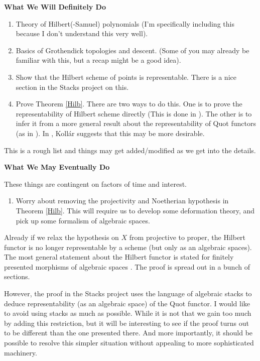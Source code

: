 \documentclass[11pt]{amsart}
\theoremstyle{definition}
\begin{document}
\textbf{What We Will Definitely Do}
\begin{enumerate}
	\item Theory of Hilbert(-Samuel) polynomials (I'm specifically including this because I don't understand this very well).
	\item Basics of Grothendick topologies and descent. (Some of you may already be familiar with this, but a recap might be a good idea).
	\item Show that the Hilbert scheme of points is representable. There is a nice section in the Stacks project \cite[Tag 0B94]{stacks} on this.
	\item Prove Theorem \ref{Hilb}. There are two ways to do this. One is to prove the representability of Hilbert scheme directly (This is done in \cite{Kollar}). The other is to infer it from a more general result about the representability of Quot functors (as in \cite{FGAExplained}). In \cite{Kollar}, Koll\'{a}r suggests that this may be more desirable.
\end{enumerate}

This is a rough list and things may get added/modified as we get into the details.


\vspace{.3cm}
\textbf{What We May Eventually Do}

These things are contingent on factors of time and interest.
\begin{enumerate}
	\item Worry about removing the projectivity and Noetherian hypothesis in Theorem \ref{Hilb}. This will require us to develop some deformation theory, and pick up some formalism of algebraic spaces. 
\end{enumerate}

Already if we relax the hypothesis on $X$ from projective to proper, the Hilbert functor is no longer representable by a scheme (but only as an algebraic spaces). The most general statement about the Hilbert functor is stated for finitely presented morphisms of algebraic spaces \cite[Tag 0CZX]{stacks}. The proof is spread out in a bunch of sections. 

However, the proof in the Stacks project uses the language of algebraic stacks to deduce representability (as an algebraic space) of the Quot functor. I would like to avoid using stacks as much as possible. While it is not that we gain too much by adding this restriction, but it will be interesting to see if the proof turns out to be different than the one presented there. And more importantly, it should be possible to resolve this simpler situation without appealing to more sophisticated machinery. 



\end{document}
